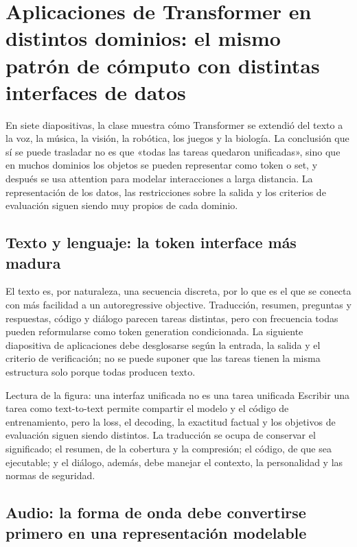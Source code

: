 \section{Aplicaciones de Transformer en distintos dominios: el mismo patrón de cómputo con distintas interfaces de datos}

En siete diapositivas, la clase muestra cómo Transformer se extendió del texto a la voz, la música, la visión, la robótica, los juegos y la biología. La conclusión que sí se puede trasladar no es que «todas las tareas quedaron unificadas», sino que en muchos dominios los objetos se pueden representar como token o set, y después se usa attention para modelar interacciones a larga distancia. La representación de los datos, las restricciones sobre la salida y los criterios de evaluación siguen siendo muy propios de cada dominio.

\subsection{Texto y lenguaje: la token interface más madura}

El texto es, por naturaleza, una secuencia discreta, por lo que es el que se conecta con más facilidad a un autoregressive objective. Traducción, resumen, preguntas y respuestas, código y diálogo parecen tareas distintas, pero con frecuencia todas pueden reformularse como token generation condicionada. La siguiente diapositiva de aplicaciones debe desglosarse según la entrada, la salida y el criterio de verificación; no se puede suponer que las tareas tienen la misma estructura solo porque todas producen texto.


\begin{knowledgebox}{Lectura de la figura: una interfaz unificada no es una tarea unificada}
Escribir una tarea como text-to-text permite compartir el modelo y el código de entrenamiento, pero la loss, el decoding, la exactitud factual y los objetivos de evaluación siguen siendo distintos. La traducción se ocupa de conservar el significado; el resumen, de la cobertura y la compresión; el código, de que sea ejecutable; y el diálogo, además, debe manejar el contexto, la personalidad y las normas de seguridad.
\end{knowledgebox}

\subsection{Audio: la forma de onda debe convertirse primero en una representación modelable}


